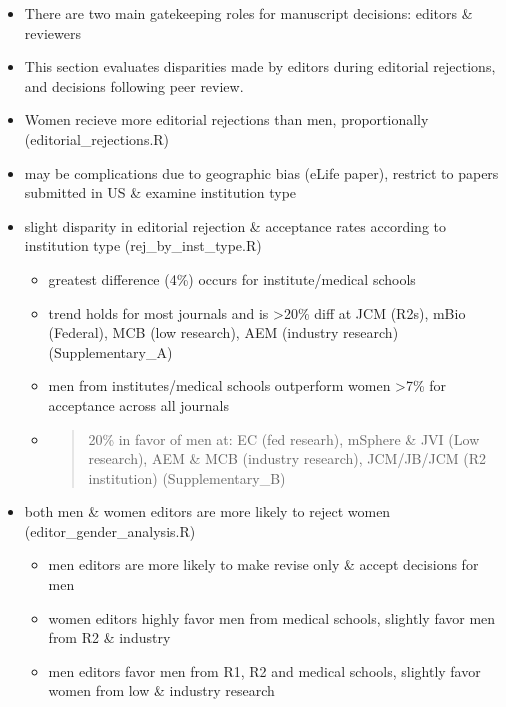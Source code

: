 \documentclass[11pt,]{article}
\providecommand{\tightlist}{%
  \setlength{\itemsep}{0pt}\setlength{\parskip}{0pt}}
\begin{document}
\begin{itemize}
\tightlist
\item
  There are two main gatekeeping roles for manuscript decisions: editors
  \& reviewers
\item
  This section evaluates disparities made by editors during editorial
  rejections, and decisions following peer review.
\item
  Women recieve more editorial rejections than men, proportionally
  (editorial\_rejections.R)
\item
  may be complications due to geographic bias (eLife paper), restrict to
  papers submitted in US \& examine institution type
\item
  slight disparity in editorial rejection \& acceptance rates according
  to institution type (rej\_by\_inst\_type.R)

  \begin{itemize}
  \item
    greatest difference (4\%) occurs for institute/medical schools
  \item
    trend holds for most journals and is \textgreater{}20\% diff at JCM
    (R2s), mBio (Federal), MCB (low research), AEM (industry research)
    (Supplementary\_A)
  \item
    men from institutes/medical schools outperform women
    \textgreater{}7\% for acceptance across all journals
  \item
    \begin{quote}
    20\% in favor of men at: EC (fed researh), mSphere \& JVI (Low
    research), AEM \& MCB (industry research), JCM/JB/JCM (R2
    institution) (Supplementary\_B)
    \end{quote}
  \end{itemize}
\item
  both men \& women editors are more likely to reject women
  (editor\_gender\_analysis.R)

  \begin{itemize}
  \tightlist
  \item
    men editors are more likely to make revise only \& accept decisions
    for men
  \item
    women editors highly favor men from medical schools, slightly favor
    men from R2 \& industry
  \item
    men editors favor men from R1, R2 and medical schools, slightly
    favor women from low \& industry research
  \end{itemize}
\end{itemize}
\end{document}
